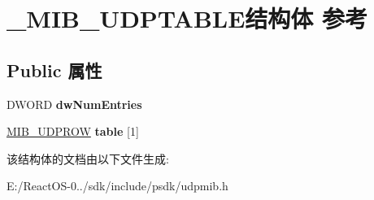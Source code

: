 \hypertarget{struct___m_i_b___u_d_p_t_a_b_l_e}{}\section{\+\_\+\+M\+I\+B\+\_\+\+U\+D\+P\+T\+A\+B\+L\+E结构体 参考}
\label{struct___m_i_b___u_d_p_t_a_b_l_e}
\subsection*{Public 属性}
\begin{DoxyCompactItemize}
\item 
\mbox{\label{struct___m_i_b___u_d_p_t_a_b_l_e_a126a42e9e9ccc40bf06f34af8b2d568e}} 
D\+W\+O\+RD {\bfseries dw\+Num\+Entries}
\item 
\mbox{\label{struct___m_i_b___u_d_p_t_a_b_l_e_a20668542aefd76b651cbeef74d9fad80}} 
\hyperlink{struct___m_i_b___u_d_p_r_o_w}{M\+I\+B\+\_\+\+U\+D\+P\+R\+OW} {\bfseries table} \mbox{[}1\mbox{]}
\end{DoxyCompactItemize}


该结构体的文档由以下文件生成\+:\begin{DoxyCompactItemize}
\item 
E\+:/\+React\+O\+S-\/0../sdk/include/psdk/udpmib.\+h\end{DoxyCompactItemize}
